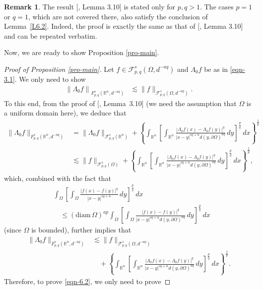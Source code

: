 \documentclass[11pt,twoside]{article}
\def\rn{{\mathbb{R}^n}}
\def\cf{{\mathcal F}}
\def\boz{{\Omega}}
\def\pa{\partial}                %
\newcounter{assum}
\theoremstyle{mylem}
\theoremstyle{definition}
\newtheorem{remark}[theorem]{Remark}
\numberwithin{equation}{section}
\begin{document}
\begin{remark}
The result [\cite{ps2017}, Lemma 3.10] is stated only for $p,q>1$. The cases $p=1$ or $q=1$,
which are not covered there, also satisfy the conclusion of Lemma~\ref{L6.2}.
Indeed, the proof is exactly the same as that of [\cite{ps2017}, Lemma 3.10] and can be repeated verbatim.
\end{remark}
Now, we are ready to show Proposition \ref{pro-main}.
\begin{proof}[Proof of Proposition \ref{pro-main}]
Let $f\in\cf_{p,q}^{s}(\boz,d^{-aq})$ and $\Lambda_0 f$ be as in \eqref{eqn-3.1}. We only need to show
\begin{align}\label{eqn-6.2}
\left\| \Lambda_0 f \right\|_{F_{p,q}^{s}(\rn,d^{-aq})}
&\lesssim \| f \|_{\cf_{p,q}^{s}(\boz,d^{-aq})}.
\end{align}
To this end, from the proof of [\cite{ps2017}, Lemma~3.10]
(we need the assumption that $\Omega$ is a uniform domain here),
we deduce that
\begin{align*}
\| \Lambda_0 f \|_{F_{p,q}^{s}(\rn,d^{-aq})}
&= \| \Lambda_0 f \|_{\cf_{p,q}^{s}(\rn)} +\left\{\int_{\rn} \left[ \int_{\rn} \frac{|\Lambda_0 f(x) - \Lambda_0 f(y)|^q}{|x - y|^{s q + n}d(y,\pa\boz)^{aq}}\,dy \right]^{\frac{p}{q}}\,dx \right\}^{\frac{1}{p}} \\
&\lesssim\|f\|_{\cf_{p,q}^{s}(\Omega)} +\left\{\int_{\rn} \left[ \int_{\rn} \frac{|\Lambda_0 f(x) - \Lambda_0 f(y)|^q}{|x - y|^{s q + n}d(y,\pa\boz)^{aq}}\,dy \right]^{\frac{p}{q}}\,dx \right\}^{\frac{1}{p}},
\end{align*}
which, combined with the fact that
\begin{align}\label{1544}
&\int_{\boz} \left[ \int_{\boz} \frac{|f(x)-f(y)|^q}{|x - y|^{s q + n}}\,dy \right]^{\frac{p}{q}}\,dx\nonumber\\
&\quad\leq
(\mathrm{diam\,}\Omega)^{ap}\int_{\boz} \left[ \int_{\boz} \frac{|f(x) - f(y)|^q}{|x - y|^{s q + n}d(y,\pa\boz)^{aq}}\,dy \right]^{\frac{p}{q}}\,dx
\end{align}
(since $\Omega$ is bounded),
further implies that
\begin{align*}
\| \Lambda_0 f \|_{F_{p,q}^{s}(\rn,d^{-aq})}
&\lesssim\|f\|_{\cf_{p,q}^{s}(\boz,d^{-aq})}\\
&\quad+\left\{\int_{\rn} \left[ \int_{\rn} \frac{|\Lambda_0 f(x) - \Lambda_0 f(y)|^q}{|x - y|^{s q + n}d(y,\pa\boz)^{aq}}\,dy \right]^{\frac{p}{q}}\,dx \right\}^{\frac{1}{p}}.
\end{align*}
Therefore, to prove \eqref{eqn-6.2}, we only need to prove

\end{proof}
\end{document}
